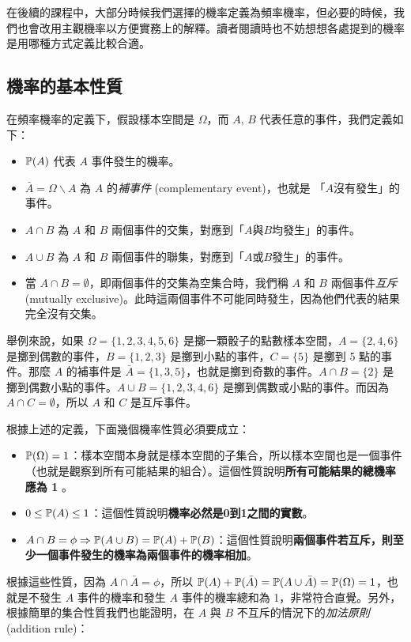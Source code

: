     在後續的課程中，大部分時候我們選擇的機率定義為頻率機率，但必要的時候，我們也會改用主觀機率以方便實務上的解釋。讀者閱讀時也不妨想想各處提到的機率是用哪種方式定義比較合適。
\subsection{機率的基本性質}
    在頻率機率的定義下，假設樣本空間是 $\Omega$，而 $A$, $B$ 代表任意的事件，我們定義如下：
    \begin{itemize}
        \item $\mathbb{P}(A)$ 代表 $A$ 事件發生的機率。
        \item $\bar{A} = \Omega \backslash A$ 為 $A$ 的\textit{補事件} (complementary event)，也就是 「$A$沒有發生」的事件。
        \item $A \cap B$ 為 $A$ 和 $B$ 兩個事件的交集，對應到「$A$與$B$均發生」的事件。
        \item $A \cup B$ 為 $A$ 和 $B$ 兩個事件的聯集，對應到「$A$或$B$發生」的事件。
        \item 當 $A \cap B = \emptyset$，即兩個事件的交集為空集合時，我們稱 $A$ 和 $B$ 兩個事件\textit{互斥} (mutually exclusive)。此時這兩個事件不可能同時發生，因為他們代表的結果完全沒有交集。
    \end{itemize}
    舉例來說，如果 $\Omega = \{1,2,3,4,5,6\}$ 是擲一顆骰子的點數樣本空間，$A = \{2,4,6\}$ 是擲到偶數的事件，$B = \{1,2,3\}$ 是擲到小點的事件，$C = \{5\}$ 是擲到 5 點的事件。那麼 $A$ 的補事件是 $\bar{A} = \{1,3,5\}$，也就是擲到奇數的事件。$A \cap B = \{2\}$ 是擲到偶數小點的事件。$A \cup B = \{1,2,3,4,6\}$ 是擲到偶數或小點的事件。而因為 $A \cap C = \emptyset$，所以 $A$ 和 $C$ 是互斥事件。

    根據上述的定義，下面幾個機率性質必須要成立：
    
    \begin{itemize}
        \item $\mathbb{P}(\Omega) = 1$：樣本空間本身就是樣本空間的子集合，所以樣本空間也是一個事件（也就是觀察到所有可能結果的組合）。這個性質說明\textbf{所有可能結果的總機率應為 1} 。
        \item $0 \le \mathbb{P}(A) \le 1$：這個性質說明\textbf{機率必然是0到1之間的實數}。
        \item $A \cap B = \phi \Rightarrow \mathbb{P}(A \cup B) = \mathbb{P}(A) + \mathbb{P}(B)$：這個性質說明\textbf{兩個事件若互斥，則至少一個事件發生的機率為兩個事件的機率相加}。
    \end{itemize}

    根據這些性質，因為 $A \cap \bar{A} = \phi$，所以 $\mathbb{P}(A) + \mathbb{P}(\bar{A}) = \mathbb{P}(A \cup \bar{A}) = \mathbb{P}(\Omega) = 1$，也就是不發生 $A$ 事件的機率和發生 $A$ 事件的機率總和為 1，非常符合直覺。另外，根據簡單的集合性質我們也能證明，在 $A$ 與 $B$ 不互斥的情況下的\textit{加法原則} (addition rule)：
    
